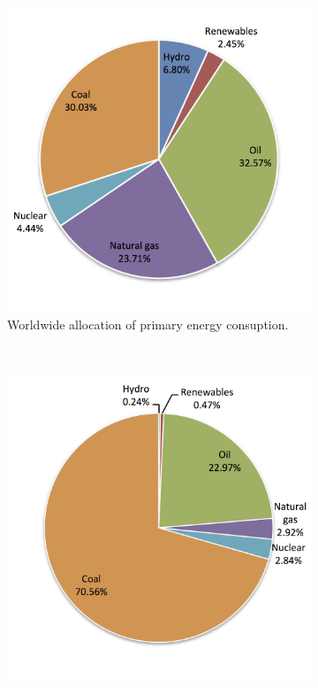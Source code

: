 \begin{figure}[!b]
        \centering                
        \begin{subfigure}[b]{0.45\textwidth}
                \centering
                \includegraphics[width=1\textwidth]{FIG/PrimWorld}
                \caption{Worldwide allocation of primary energy consuption.}\label{PrimWorld}
        \end{subfigure}
        ~
        \begin{subfigure}[b]{0.45\textwidth}
                \centering
                \includegraphics[width=1\textwidth]{FIG/PrimSA}

\end{subfigure}
\end{figure}
